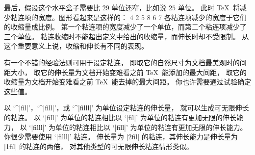 {{{{{{%
最后，假设这个水平盒子需要比 $29$ 单位还窄，比如说 $25$ 单位。
此时 \TeX\ 将减少粘连项的宽度。图形看起来是这样的：
 {  4 2 5   8 6 7  }
各粘连项减少的宽度于它们的收缩量成比例。
第一个粘连项的宽度减少了一个单位，而第二个粘连项减少了三个单位。
粘连收缩时不能超出定义中给出的收缩量，而伸长时却不受限制。
从这个重要意义上说，收缩和伸长有不同的表现。

有一个不错的经验法则可用于设定粘连，
即取它的自然尺寸为文档最美观时的间距大小，
取它的伸长量为文档开始变难看之前 \TeX\ 能添加的最大间距，
取它的收缩量为文档开始变难看之前 \TeX\ 能去掉的最大间距。
你也许需要通过试验确定这些值。

以 `^|fil|'，`^|fill|'，或 `^|filll|' 为单位设定粘连的伸长量，
就可以生成可无限伸长的粘连。
以 `|fill|' 为单位的粘连相比以 `|fil|' 为单位的粘连有更加无限的伸长能力，
以 `|filll|' 为单位的粘连相比以 `|fill|' 为单位的粘连有更加无限的伸长能力。
你很少需要使用 `|filll|' 粘连。
伸长量为 |2fil| 的粘连，其伸长能力是伸长量为 |1fil| 的粘连的两倍，
对其他类型的可无限伸长粘连情形类似。

}}}}}}
